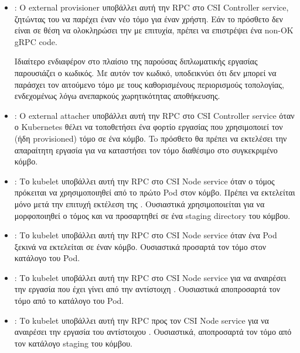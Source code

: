 \begin{itemize}

      \item{}: Ο external provisioner υποβάλλει αυτή την RPC
            στο CSI Controller service, ζητώντας του να παρέχει έναν νέο τόμο
            για έναν χρήστη. Εάν το πρόσθετο δεν είναι σε θέση να ολοκληρώσει
            την  με επιτυχία, πρέπει να επιστρέψει ένα non-OK
            gRPC code.


            Ιδιαίτερο ενδιαφέρον στο πλαίσιο της παρούσας διπλωματικής εργασίας
            παρουσιάζει ο  κωδικός. Με αυτόν τον κωδικό,
            υποδεικνύει ότι δεν μπορεί να παράσχει τον αιτούμενο τόμο με τους
            καθορισμένους περιορισμούς τοπολογίας, ενδεχομένως λόγω ανεπαρκούς
            χωρητικότητας αποθήκευσης.

      \item{}: Ο external attacher υποβάλλει αυτή
            την RPC στο CSI Controller service όταν ο Kubernetes θέλει να
            τοποθετήσει ένα φορτίο εργασίας που χρησιμοποιεί τον (ήδη
            provisioned) τόμο σε ένα κόμβο. To πρόσθετο θα πρέπει να εκτελέσει
            την απαραίτητη εργασία για να καταστήσει τον τόμο διαθέσιμο στο
            συγκεκριμένο κόμβο.

      \item{}:  Το kubelet υποβάλλει αυτή την RPC στο CSI
            Node service όταν ο τόμος πρόκειται να χρησιμοποιηθεί από το πρώτο
            Pod στον κόμβο. Πρέπει να εκτελείται μόνο μετά την επιτυχή εκτέλεση
            της . Ουσιαστικά χρησιμοποιείται για να
            μορφοποιηθεί ο τόμος και να προσαρτηθεί σε ένα staging directory του
            κόμβου.

      \item{}: Το kubelet υποβάλλει αυτή την RPC στο CSI
            Node service όταν ένα Pod ξεκινά να εκτελείται σε έναν κόμβο.
            Ουσιαστικά προσαρτά τον τόμο στον κατάλογο του Pod.

      \item{}: Το kubelet υποβάλλει αυτή την RPC στο CSI
            Node service για να αναιρέσει την εργασία που έχει γίνει από την
            αντίστοιχη . Ουσιαστικά αποπροσαρτά τον τόμο
            από το κατάλογο του Pod.

      \item{}: Το kubelet υποβάλλει αυτή την RPC προς τον
            CSI Node service για να αναιρέσει την εργασία του αντίστοιχου
            . Ουσιαστικά, αποπροσαρτά τον τόμο από τον
            κατάλογο staging του κόμβου.


\end{itemize}
